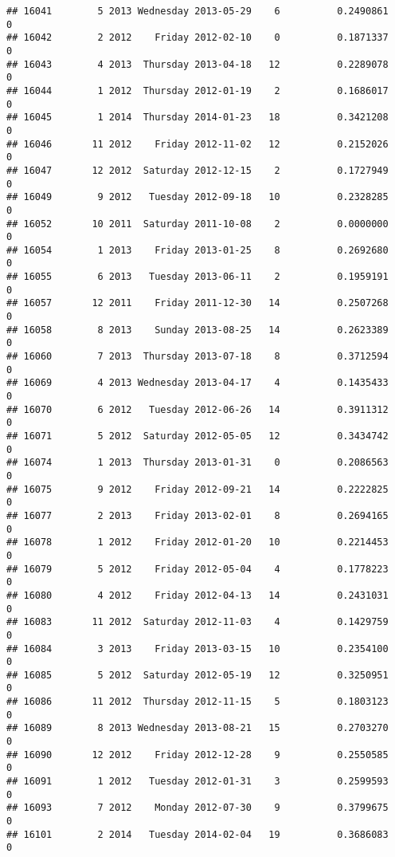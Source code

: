 \documentclass[
]{article}
\begin{document}
\begin{verbatim}
## 16041        5 2013 Wednesday 2013-05-29    6          0.2490861             0
## 16042        2 2012    Friday 2012-02-10    0          0.1871337             0
## 16043        4 2013  Thursday 2013-04-18   12          0.2289078             0
## 16044        1 2012  Thursday 2012-01-19    2          0.1686017             0
## 16045        1 2014  Thursday 2014-01-23   18          0.3421208             0
## 16046       11 2012    Friday 2012-11-02   12          0.2152026             0
## 16047       12 2012  Saturday 2012-12-15    2          0.1727949             0
## 16049        9 2012   Tuesday 2012-09-18   10          0.2328285             0
## 16052       10 2011  Saturday 2011-10-08    2          0.0000000             0
## 16054        1 2013    Friday 2013-01-25    8          0.2692680             0
## 16055        6 2013   Tuesday 2013-06-11    2          0.1959191             0
## 16057       12 2011    Friday 2011-12-30   14          0.2507268             0
## 16058        8 2013    Sunday 2013-08-25   14          0.2623389             0
## 16060        7 2013  Thursday 2013-07-18    8          0.3712594             0
## 16069        4 2013 Wednesday 2013-04-17    4          0.1435433             0
## 16070        6 2012   Tuesday 2012-06-26   14          0.3911312             0
## 16071        5 2012  Saturday 2012-05-05   12          0.3434742             0
## 16074        1 2013  Thursday 2013-01-31    0          0.2086563             0
## 16075        9 2012    Friday 2012-09-21   14          0.2222825             0
## 16077        2 2013    Friday 2013-02-01    8          0.2694165             0
## 16078        1 2012    Friday 2012-01-20   10          0.2214453             0
## 16079        5 2012    Friday 2012-05-04    4          0.1778223             0
## 16080        4 2012    Friday 2012-04-13   14          0.2431031             0
## 16083       11 2012  Saturday 2012-11-03    4          0.1429759             0
## 16084        3 2013    Friday 2013-03-15   10          0.2354100             0
## 16085        5 2012  Saturday 2012-05-19   12          0.3250951             0
## 16086       11 2012  Thursday 2012-11-15    5          0.1803123             0
## 16089        8 2013 Wednesday 2013-08-21   15          0.2703270             0
## 16090       12 2012    Friday 2012-12-28    9          0.2550585             0
## 16091        1 2012   Tuesday 2012-01-31    3          0.2599593             0
## 16093        7 2012    Monday 2012-07-30    9          0.3799675             0
## 16101        2 2014   Tuesday 2014-02-04   19          0.3686083             0

\end{verbatim}
\end{document}
